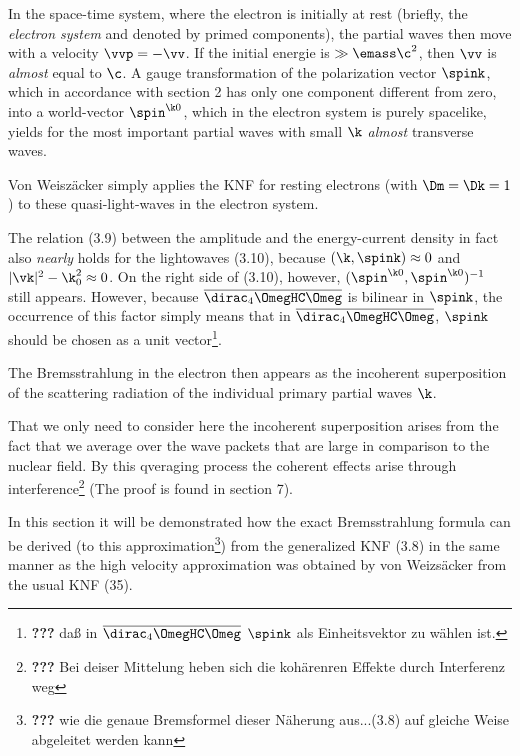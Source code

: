 \documentclass{article}
\newcommand{\WTF}[1]{\footnote{\textbf{???} #1}}
\newcommand{\barred}[1]{
\overline{#1}
}
\renewcommand{\it}[1]{\textit{#1}}
\begin{document}
In the space-time system, where the electron is initially at rest (briefly, the \it{electron system} and denoted by primed components), the partial waves then move with a velocity $\vvp = -\vv$. If the initial energie is $\gg \emass\c^2$, then $\vv$ is \it{almost} equal to $\c$. A gauge transformation of the polarization vector $\spink$, which in accordance with section 2 has only one component different from zero, into a world-vector $\spin^{\k 0}$, which in the electron system is purely spacelike, yields for the most important partial waves with small $\k$ \it{almost} transverse waves.

Von Weiszäcker simply applies the KNF for resting electrons (with $\Dm = \Dk = 1$) to these quasi-light-waves in the electron system.

The relation (3.9) between the amplitude and the energy-current density in fact also \it{nearly} holds for the lightowaves (3.10), because $(\k,\spink) \approx 0$ and $|\vk|^2 - \k_0^2 \approx 0$. On the right side of (3.10), however, $(\spin^{\k 0}, \spin^{\k 0})^{-1}$ still appears. However, because $\barred{\dirac_4\OmegHC\Omeg}$ is bilinear in $\spink$, the occurrence of this factor simply means that in $\barred{\dirac_4\OmegHC\Omeg}$, $\spink$ should be chosen as a unit vector\WTF{daß in $\barred{\dirac_4\OmegHC\Omeg}$ $\spink$ als Einheitsvektor zu wählen ist.}.

The Bremsstrahlung in the electron then appears as the incoherent superposition of the scattering radiation of the individual primary partial waves $\k$.

That we only need to consider here the incoherent superposition arises from the fact that we average over the wave packets that are large in comparison to the nuclear field. By this qveraging process the coherent effects arise through interference\WTF{Bei deiser Mittelung heben sich die kohärenren Effekte durch Interferenz weg} (The proof is found in section 7).

In this section it will be demonstrated how the exact Bremsstrahlung formula can be derived (to this approximation\WTF{wie die genaue Bremsformel dieser Näherung aus...(3.8) auf gleiche Weise abgeleitet werden kann}) from the generalized KNF (3.8) in the same manner as the high velocity approximation was obtained by von Weizsäcker from the usual KNF (35).
\end{document}
